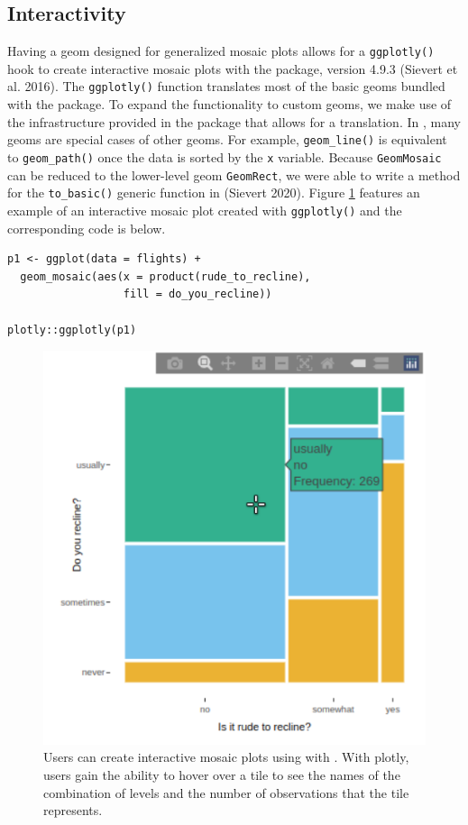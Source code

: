 \hypertarget{interactivity}{%
\subsection*{Interactivity}\label{interactivity}}

Having a geom designed for generalized mosaic plots allows for a \texttt{ggplotly()} hook to create interactive mosaic plots with the  package, version 4.9.3 (Sievert et al. 2016). The \texttt{ggplotly()} function translates most of the basic geoms bundled with the  package. To expand the functionality to custom geoms, we make use of the infrastructure provided in the  package that allows for a translation. In , many geoms are special cases of other geoms. For example, \texttt{geom\_line()} is equivalent to \texttt{geom\_path()} once the data is sorted by the \texttt{x} variable. Because \texttt{GeomMosaic} can be reduced to the lower-level geom \texttt{GeomRect}, we were able to write a method for the \texttt{to\_basic()} generic function in  (Sievert 2020). Figure \ref{fig:plotly-static} features an example of an interactive mosaic plot created with \texttt{ggplotly()} and the corresponding code is below.

\begin{verbatim}
p1 <- ggplot(data = flights) +
  geom_mosaic(aes(x = product(rude_to_recline), 
                  fill = do_you_recline)) 

plotly::ggplotly(p1)
\end{verbatim}

\begin{figure}

{\centering \includegraphics[width=0.6\linewidth]{plotly} 

}

\caption{Users can create interactive mosaic plots using   with . With plotly, users gain the ability to hover over a tile to see the names of the combination of levels and the number of observations that the tile represents.}\label{fig:plotly-static}
\end{figure}

